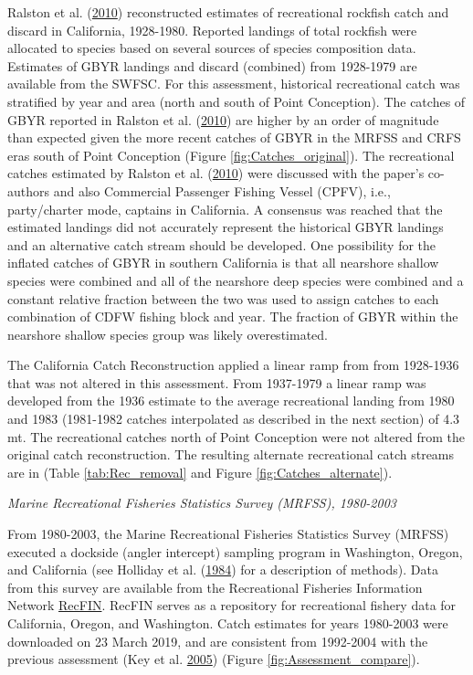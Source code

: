 \documentclass[12pt,]{article}
\begin{document}
Ralston et al. (\protect\hyperlink{ref-Ralston2010}{2010}) reconstructed
estimates of recreational rockfish catch and discard in California,
1928-1980. Reported landings of total rockfish were allocated to species
based on several sources of species composition data. Estimates of GBYR
landings and discard (combined) from 1928-1979 are available from the
SWFSC. For this assessment, historical recreational catch was stratified
by year and area (north and south of Point Conception). The catches of
GBYR reported in Ralston et al.
(\protect\hyperlink{ref-Ralston2010}{2010}) are higher by an order of
magnitude than expected given the more recent catches of GBYR in the
MRFSS and CRFS eras south of Point Conception (Figure
\ref{fig:Catches_original}). The recreational catches estimated by
Ralston et al. (\protect\hyperlink{ref-Ralston2010}{2010}) were
discussed with the paper's co-authors and also Commercial Passenger
Fishing Vessel (CPFV), i.e., party/charter mode, captains in California.
A consensus was reached that the estimated landings did not accurately
represent the historical GBYR landings and an alternative catch stream
should be developed. One possibility for the inflated catches of GBYR in
southern California is that all nearshore shallow species were combined
and all of the nearshore deep species were combined and a constant
relative fraction between the two was used to assign catches to each
combination of CDFW fishing block and year. The fraction of GBYR within
the nearshore shallow species group was likely overestimated.

The California Catch Reconstruction applied a linear ramp from from
1928-1936 that was not altered in this assessment. From 1937-1979 a
linear ramp was developed from the 1936 estimate to the average
recreational landing from 1980 and 1983 (1981-1982 catches interpolated
as described in the next section) of 4.3 mt. The recreational catches
north of Point Conception were not altered from the original catch
reconstruction. The resulting alternate recreational catch streams are
in (Table \ref{tab:Rec_removal} and Figure \ref{fig:Catches_alternate}).

\emph{Marine Recreational Fisheries Statistics Survey (MRFSS),
1980-2003}

From 1980-2003, the Marine Recreational Fisheries Statistics Survey
(MRFSS) executed a dockside (angler intercept) sampling program in
Washington, Oregon, and California (see Holliday et al.
(\protect\hyperlink{ref-Holliday1984}{1984}) for a description of
methods). Data from this survey are available from the Recreational
Fisheries Information Network \href{www.recfin.org}{RecFIN}. RecFIN
serves as a repository for recreational fishery data for California,
Oregon, and Washington. Catch estimates for years 1980-2003 were
downloaded on 23 March 2019, and are consistent from 1992-2004 with the
previous assessment (Key et al. \protect\hyperlink{ref-Key2005}{2005})
(Figure \ref{fig:Assessment_compare}).
\end{document}
